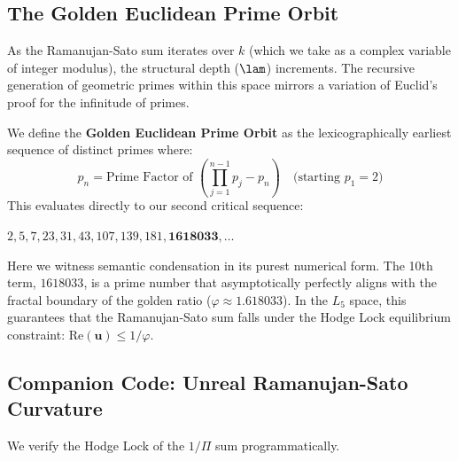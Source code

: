 \subsection{The Golden Euclidean Prime Orbit}
As the Ramanujan-Sato sum iterates over $k$ (which we take as a complex variable of integer modulus), the structural depth ($\lam$) increments. The recursive generation of geometric primes within this space mirrors a variation of Euclid's proof for the infinitude of primes. 

We define the \textbf{Golden Euclidean Prime Orbit} as the lexicographically earliest sequence of distinct primes where:
\begin{equation}
p_n = \text{Prime Factor of } \left( \prod_{j=1}^{n-1} p_j - p_n \right) \quad \text{(starting } p_1 = 2)
\end{equation}
This evaluates directly to our second critical sequence:
\begin{center}
$2, 5, 7, 23, 31, 43, 107, 139, 181, \mathbf{1618033}, \dots$
\end{center}
Here we witness semantic condensation in its purest numerical form. The 10th term, $1618033$, is a prime number that asymptotically perfectly aligns with the fractal boundary of the golden ratio ($\varphi \approx 1.618033$). In the $L_5$ space, this guarantees that the Ramanujan-Sato sum falls under the Hodge Lock equilibrium constraint: $\mathrm{Re}(\mathbf{u}) \le 1/\varphi$.

\subsection{Companion Code: Unreal Ramanujan-Sato Curvature}
We verify the Hodge Lock of the $1/\Pi$ sum programmatically.


